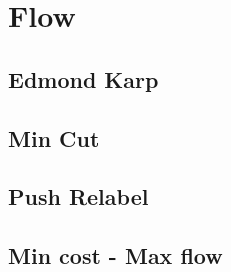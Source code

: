 \newpage
\section{Flow}
\subsection{Edmond Karp}

\subsection{Min Cut}

\subsection{Push Relabel}

\subsection{Min cost - Max flow}

